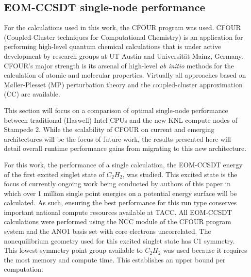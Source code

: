 \subsection{EOM-CCSDT single-node performance}
\label{sec:cfour}

For the calculations used in this work, the CFOUR \cite{cfour:08} program was
used. CFOUR (Coupled-Cluster techniques for Computational Chemistry) is an
application for performing high-level quantum chemical calculations that is
under active development by research groups at UT Austin and Universit\"{a}t
Mainz, Germany. CFOUR's major strength is its arsenal of high-level \emph{ab
initio} methods for the calculation of atomic and molecular properties.
Virtually all approaches based on M\o ller-Plesset (MP) perturbation theory and
the coupled-cluster approximation (CC) are available.

This section will focus on a comparison of optimal single-node performance
between traditional (Haswell) Intel CPUs and the new KNL compute nodes of
Stampede 2.  While the scalability of CFOUR on current and emerging
architectures will be the focus of future work, the results presented here will
detail overall runtime performance gains from migrating to this new
architecture.

For this work, the performance of a single calculation, the EOM-CCSDT energy of the first
excited singlet state of $C_2H_2$, was studied.
This excited state is the focus of currently ongoing work being conducted by authors of this paper
in which over 1 million single point energies on a potential energy surface will be calculated.
As such, ensuring the best performance for this run type conserves important national compute resources
available at TACC.  All EOM-CCSDT calculations were performed
using the NCC module\cite{ncc:15} of the CFOUR program system and the ANO1 basis set\cite{ano1:87} with core
electrons uncorrelated. The nonequilibrium geometry used for this excited singlet state has C1 symmetry.
This lowest symmetry point group available to $C_2H_2$ was used because it requires the most memory
and compute time. This establishes an upper bound per computation.

